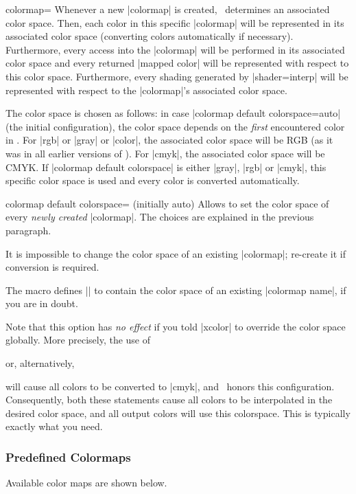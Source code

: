 \begin{pgfplotskey}{colormap=}
Whenever a new |colormap| is created, \PGFPlots\ determines an associated color space. Then, each color in this specific |colormap| will be represented in its associated color space (converting colors automatically if necessary). Furthermore, every access into the |colormap| will be performed in its associated color space and every returned |mapped color| will be represented with respect to this color space. Furthermore, every shading generated by |shader=interp| will be represented with respect to the |colormap|'s associated color space. 

The color space is chosen as follows: in case |colormap default colorspace=auto| (the initial configuration), the color space depends on the \emph{first} encountered color in . For |rgb| or |gray| or |color|, the associated color space will be RGB (as it was in all earlier versions of \PGFPlots). For |cmyk|, the associated color space will be CMYK. If |colormap default colorspace| is either |gray|, |rgb| or |cmyk|, this specific color space is used and every color is converted automatically.
\begin{pgfplotskey}{colormap default colorspace= (initially auto)}
	Allows to set the color space of every \emph{newly created} |colormap|. The choices are explained in the previous paragraph.

	It is impossible to change the color space of an existing |colormap|; re-create it if conversion is required.

	The macro \declareandlabel{\pgfplotscolormapgetcolorspace} defines |\pgfplotsretval| to contain the color space of an existing |colormap name|, if you are in doubt.

	Note that this option has \emph{no effect} if you told |xcolor| to override the color space globally. More precisely, the use of 
\begin{codeexample}
\usepackage[cmyk]{xcolor}
\end{codeexample}
	or, alternatively,
\begin{codeexample}
\end{codeexample}
	will cause all colors to be converted to |cmyk|, and \PGFPlots\ honors this configuration. Consequently, both these statements cause all colors to be interpolated in the desired color space, and all output colors will use this colorspace. This is typically exactly what you need.

\end{pgfplotskey}

\subsubsection{Predefined Colormaps}
Available color maps are shown below.

\end{pgfplotskey}

